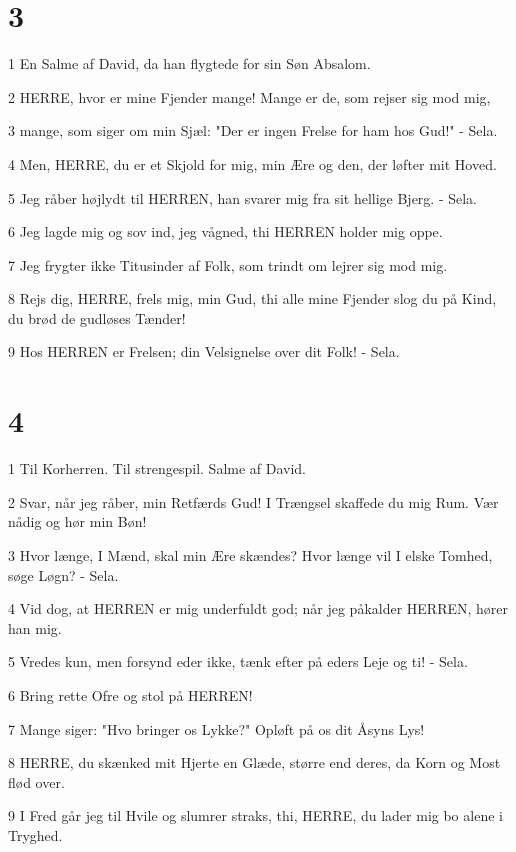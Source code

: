 \chapter{3}

\par 1 En Salme af David, da han flygtede for sin Søn Absalom.
\par 2 HERRE, hvor er mine Fjender mange! Mange er de, som rejser sig mod mig,
\par 3 mange, som siger om min Sjæl: "Der er ingen Frelse for ham hos Gud!" - Sela.
\par 4 Men, HERRE, du er et Skjold for mig, min Ære og den, der løfter mit Hoved.
\par 5 Jeg råber højlydt til HERREN, han svarer mig fra sit hellige Bjerg. - Sela.
\par 6 Jeg lagde mig og sov ind, jeg vågned, thi HERREN holder mig oppe.
\par 7 Jeg frygter ikke Titusinder af Folk, som trindt om lejrer sig mod mig.
\par 8 Rejs dig, HERRE, frels mig, min Gud, thi alle mine Fjender slog du på Kind, du brød de gudløses Tænder!
\par 9 Hos HERREN er Frelsen; din Velsignelse over dit Folk! - Sela.

\chapter{4}

\par 1 Til Korherren. Til strengespil. Salme af David.
\par 2 Svar, når jeg råber, min Retfærds Gud! I Trængsel skaffede du mig Rum. Vær nådig og hør min Bøn!
\par 3 Hvor længe, I Mænd, skal min Ære skændes? Hvor længe vil I elske Tomhed, søge Løgn? - Sela.
\par 4 Vid dog, at HERREN er mig underfuldt god; når jeg påkalder HERREN, hører han mig.
\par 5 Vredes kun, men forsynd eder ikke, tænk efter på eders Leje og ti! - Sela.
\par 6 Bring rette Ofre og stol på HERREN!
\par 7 Mange siger: "Hvo bringer os Lykke?" Opløft på os dit Åsyns Lys!
\par 8 HERRE, du skænked mit Hjerte en Glæde, større end deres, da Korn og Most flød over.
\par 9 I Fred går jeg til Hvile og slumrer straks, thi, HERRE, du lader mig bo alene i Tryghed.

